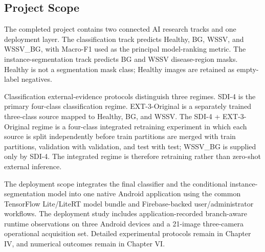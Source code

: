 \documentclass[12pt,a4paper]{report}
\newenvironment{revisionblock}{\begin{snugshade}\noindent}{\end{snugshade}}
\begin{document}
\subsection{\texorpdfstring{\colorbox{RevisionYellow}{Project Scope}}{Project Scope}}
\begin{revisionblock}
The completed project contains two connected AI research tracks and one deployment layer. The classification track predicts Healthy, BG, WSSV, and WSSV\_BG, with Macro-F1 used as the principal model-ranking metric. The instance-segmentation track predicts BG and WSSV disease-region masks. Healthy is not a segmentation mask class; Healthy images are retained as empty-label negatives.
\end{revisionblock}
\begin{revisionblock}
Classification external-evidence protocols distinguish three regimes. SDI-4 is the primary four-class classification regime. EXT-3-Original is a separately trained three-class source mapped to Healthy, BG, and WSSV. The SDI-4 + EXT-3-Original regime is a four-class integrated retraining experiment in which each source is split independently before train partitions are merged with train partitions, validation with validation, and test with test; WSSV\_BG is supplied only by SDI-4. The integrated regime is therefore retraining rather than zero-shot external inference.
\end{revisionblock}
\begin{revisionblock}
The deployment scope integrates the final classifier and the conditional instance-segmentation model into one native Android application using the common TensorFlow Lite/LiteRT model bundle and Firebase-backed user/administrator workflows. The deployment study includes application-recorded branch-aware runtime observations on three Android devices and a 21-image three-camera operational acquisition set. Detailed experimental protocols remain in Chapter IV, and numerical outcomes remain in Chapter VI.
\end{revisionblock}
\begingroup
\footnotesize
\setlength{\tabcolsep}{2pt}
\renewcommand{\arraystretch}{1.16}
\end{document}
